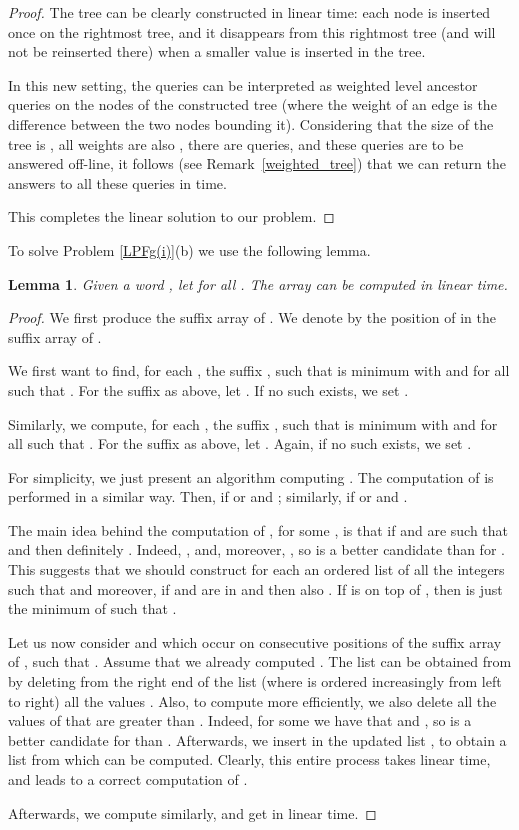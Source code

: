 \documentclass[final]{dmtcs-episciences}
\newtheorem{lemma}{Lemma}
\begin{document}
\begin{proof}
The tree can be clearly constructed in linear time: each node is inserted once on the rightmost tree, and it disappears from this rightmost tree (and will not be reinserted there) when a smaller value is inserted in the tree.

In this new setting, the queries can be interpreted as weighted level ancestor queries on the nodes of the constructed tree (where the weight of an edge is the difference between the two nodes bounding it). Considering that the size of the tree is 
, all weights are also , there are  queries, and these queries are to be answered off-line, it follows (see Remark~\ref{weighted_tree}) that we can return the answers to all these queries in  time. 

This completes the linear solution to our problem. 
\end{proof}

To solve Problem \ref{LPFg(i)}(b) we use the following lemma.
\begin{lemma}\label{overlapping_LPF}
Given a word , let  for all . The array  can be computed in linear time.
\end{lemma}
\begin{proof}
We first produce the suffix array of . We denote by  the position of  in the suffix array of . 

We first want to find, for each , the suffix , such that  is minimum with  and  for all  such that .
For the suffix  as above, let . If no such  exists, we set . 

Similarly, we compute, for each , the suffix , such that  is minimum with  and  for all  such that .
For the suffix  as above, let . Again, if no such  exists, we set .  

For simplicity, we just present an algorithm computing . The computation of  is performed in a similar way. Then,  if  or  and ; similarly,  if  or  and .

The main idea behind the computation of , for some , is that if  and  are such that  and  then definitely . Indeed, , and, moreover, , so  is a better candidate than  for . This suggests that we should construct for each  an ordered list  of all the integers  such that  and moreover, if  and  are in  and  then also . If  is on top of , then  is just the minimum  of  such that .

Let us now consider  and  which occur on consecutive positions of the suffix array of , such that . Assume that we already computed . The list  can be obtained from  by deleting from the right end of the list  (where  is ordered increasingly from left to right) all the values . Also, to compute  more efficiently, we also delete all the values of  that are greater than . Indeed, for some  we have that  and , so  is a better candidate for  than . Afterwards, we insert  in the updated list , to obtain a list  from which  can be computed. Clearly, this entire process takes linear time, and leads to a correct computation of . 

Afterwards, we compute  similarly, and get  in linear time.
\end{proof}
\end{document}
